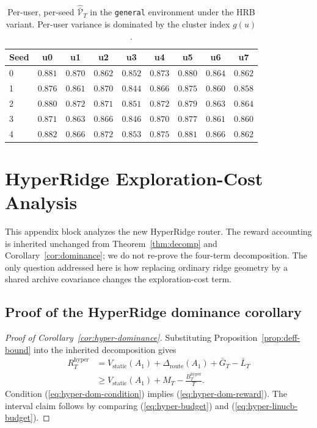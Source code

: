 \documentclass{article} %
\renewcommand{\eqref}[1]{\textup{(\ref{#1})}}
\begin{document}
\begin{table}[h]
\centering
\small
\begin{tabular}{lcccccccc}
\toprule
Seed & u0 & u1 & u2 & u3 & u4 & u5 & u6 & u7 \\
\midrule
0 & $0.881$ & $0.870$ & $0.862$ & $0.852$ & $0.873$ & $0.880$ & $0.864$ & $0.862$ \\
1 & $0.876$ & $0.861$ & $0.870$ & $0.844$ & $0.866$ & $0.875$ & $0.860$ & $0.858$ \\
2 & $0.880$ & $0.872$ & $0.871$ & $0.851$ & $0.872$ & $0.879$ & $0.863$ & $0.864$ \\
3 & $0.871$ & $0.863$ & $0.866$ & $0.846$ & $0.870$ & $0.877$ & $0.861$ & $0.860$ \\
4 & $0.882$ & $0.866$ & $0.872$ & $0.853$ & $0.875$ & $0.881$ & $0.866$ & $0.862$ \\
\bottomrule
\end{tabular}
\caption{Per-user, per-seed $\widehat{\bar{\mathcal V}}_T$ in the \texttt{general} environment under the \textnormal{HRB} variant. Per-user variance is dominated by the cluster index $g(u)$.}
\label{tab:app-peruser}
\end{table}

\clearpage

\section{HyperRidge Exploration-Cost Analysis}
\label{app:hyper-proofs}

This appendix block analyzes the new HyperRidge router.  The reward accounting is inherited unchanged from Theorem~\ref{thm:decomp} and Corollary~\ref{cor:dominance}; we do not re-prove the four-term decomposition.  The only question addressed here is how replacing ordinary ridge geometry by a shared archive covariance changes the exploration-cost term.

\subsection{Proof of the HyperRidge dominance corollary}
\label{app:proof-hyper-dominance}

\begin{proof}[Proof of Corollary~\ref{cor:hyper-dominance}]
Substituting Proposition~\ref{prop:deff-bound} into the inherited decomposition gives
\begin{equation}
\label{eq:hyper-cor-proof}
\begin{aligned}
R_T^{\mathrm{hyper}}
&=
V_{\mathrm{static}}(A_1)
+
\Delta_{\mathrm{route}}(A_1)
+
\bar G_T
-
\bar L_T
\\
&\ge
V_{\mathrm{static}}(A_1)
+
M_T
-
\frac{B_T^{\mathrm{hyper}}}{T}.
\end{aligned}
\end{equation}
Condition \eqref{eq:hyper-dom-condition} implies \eqref{eq:hyper-dom-reward}. The interval claim follows by comparing \eqref{eq:hyper-budget} and \eqref{eq:hyper-linucb-budget}.
\end{proof}
\end{document}
